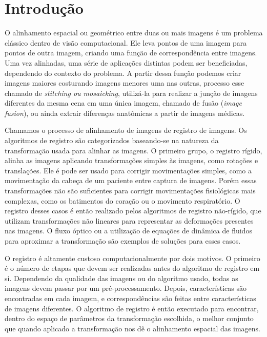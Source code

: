 \chapter{Introdução}
\label{cap:introducao}
	O alinhamento espacial ou geométrico entre duas ou mais imagens é um problema clássico dentro de visão computacional. 
Ele leva pontos de uma imagem para pontos de outra imagem, criando uma função de correspondência entre imagens. Uma vez
alinhadas, uma série de aplicações distintas podem ser beneficiadas, dependendo do contexto do problema. 
A partir  dessa função podemos criar imagens maiores costurando imagens menores uma nas outras, processo esse chamado de 
\textit{stitching ou mosaicking}, utilizá-la para realizar a junção de imagens diferentes da mesma cena em uma única 
imagem, chamado de fusão (\textit{image fusion}), ou ainda extrair diferenças anatômicas a partir de imagens médicas.

	Chamamos o processo de alinhamento de imagens de registro de imagens. Os algoritmos de registro são categorizados 
baseando-se na natureza da transformação usada para alinhar as imagens. O primeiro grupo, o registro rígido, 
alinha as imagens aplicando transformações simples às imagens, como rotações e translações. Ele é pode
ser usado para corrigir movimentações simples, como a movimentação da cabeça de um paciente entre captura de imagens. Porém
essas transformações não são suficientes para corrigir movimentações fisiológicas mais complexas, como os batimentos do coração
ou o movimento respiratório. O registro desses casos é então realizado pelos algoritmos de registro não-rígido, 
que utilizam transformações não lineares para representar as deformações presentes nas imagens. O fluxo óptico ou a 
utilização de equações de dinâmica de fluidos para aproximar a transformação são exemplos de soluções para esses casos.

	O registro é altamente custoso computacionalmente por dois motivos. O primeiro é o número de etapas que devem ser
realizadas antes do algoritmo de registro em si. Dependendo da qualidade das imagens ou do algoritmo usado, todas as 
imagens devem passar por um pré-processamento. Depois, características são encontradas em cada imagem, e correspondências
são feitas entre características de imagens diferentes. O algoritmo de registro é então executado para
encontrar, dentro do espaço de parâmetros da transformação escolhida, o melhor conjunto que quando aplicado a transformação
nos dê o alinhamento espacial das imagens.

